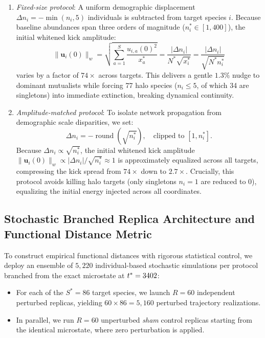\documentclass[11pt,a4paper]{article}
\begin{document}
\begin{enumerate}[label=(\roman*)]
\item \textit{Fixed-size protocol}: A uniform demographic displacement $\Delta n_i = -\min(n_i, 5)$ individuals is subtracted from target species $i$. Because baseline abundances span three orders of magnitude ($n_i^* \in [1, 400]$), the initial whitened kick amplitude:
\begin{equation}
\|\mathbf{u}_i(0)\|_w = \sqrt{\sum_{a=1}^S \frac{u_{i,a}(0)^2}{x_a^*}} = \frac{|\Delta n_i|}{N^* \sqrt{x_i^*}} = \frac{|\Delta n_i|}{\sqrt{N^* n_i^*}}
\label{eq:kick_whitened}
\end{equation}
varies by a factor of $74\times$ across targets. This delivers a gentle $1.3\%$ nudge to dominant mutualists while forcing 77 halo species ($n_i \le 5$, of which 34 are singletons) into immediate extinction, breaking dynamical continuity.
\item \textit{Amplitude-matched protocol}: To isolate network propagation from demographic scale disparities, we set:
\begin{equation}
\Delta n_i = -\operatorname{round}(\sqrt{n_i^*}), \quad \text{clipped to } [1, n_i^*].
\label{eq:matched_supp2}
\end{equation}
Because $\Delta n_i \propto \sqrt{n_i^*}$, the initial whitened kick amplitude $\|\mathbf{u}_i(0)\|_w \propto |\Delta n_i|/\sqrt{n_i^*} \approx 1$ is approximately equalized across all targets, compressing the kick spread from $74\times$ down to $2.7\times$. Crucially, this protocol avoids killing halo targets (only singletons $n_i = 1$ are reduced to 0), equalizing the initial energy injected across all coordinates.
\end{enumerate}

\subsection{Stochastic Branched Replica Architecture and Functional Distance Metric}

To construct empirical functional distances with rigorous statistical control, we deploy an ensemble of $5{,}220$ individual-based stochastic simulations per protocol branched from the exact microstate at $t^* = 3402$:
\begin{itemize}
\item For each of the $S^* = 86$ target species, we launch $R = 60$ independent perturbed replicas, yielding $60 \times 86 = 5{,}160$ perturbed trajectory realizations.
\item In parallel, we run $R = 60$ unperturbed \emph{sham} control replicas starting from the identical microstate, where zero perturbation is applied.
\end{itemize}
\end{document}
